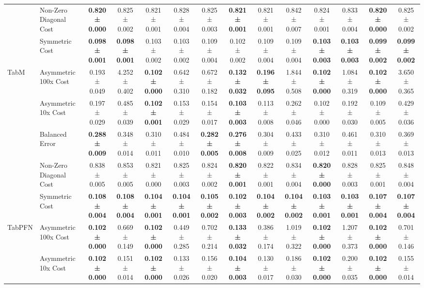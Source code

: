 \begin{table}[H]
{\begin{tabular}{llcccccccccccc}
 & Non-Zero Diagonal Cost & \textbf{0.820 ± 0.000} & 0.825 ± 0.002 & 0.821 ± 0.001 & 0.828 ± 0.004 & 0.825 ± 0.003 & \textbf{0.821 ± 0.001} & 0.821 ± 0.001 & 0.842 ± 0.007 & 0.824 ± 0.001 & 0.833 ± 0.004 & \textbf{0.820 ± 0.000} & 0.825 ± 0.002 \\
 & Symmetric Cost & \textbf{0.098 ± 0.001} & \textbf{0.098 ± 0.001} & 0.103 ± 0.002 & 0.103 ± 0.002 & 0.109 ± 0.004 & 0.102 ± 0.002 & 0.109 ± 0.004 & 0.109 ± 0.004 & \textbf{0.103 ± 0.003} & \textbf{0.103 ± 0.003} & \textbf{0.099 ± 0.002} & \textbf{0.099 ± 0.002} \\
\cline{1-14}
\multirow[t]{5}{*}{TabM} & Asymmetric 100x Cost & 0.193 ± 0.049 & 4.252 ± 0.402 & \textbf{0.102 ± 0.000} & 0.642 ± 0.310 & 0.672 ± 0.182 & \textbf{0.132 ± 0.032} & \textbf{0.196 ± 0.095} & 1.844 ± 0.508 & \textbf{0.102 ± 0.000} & 1.084 ± 0.319 & \textbf{0.102 ± 0.000} & 3.650 ± 0.365 \\
 & Asymmetric 10x Cost & 0.197 ± 0.029 & 0.485 ± 0.039 & \textbf{0.102 ± 0.001} & 0.153 ± 0.029 & 0.154 ± 0.017 & \textbf{0.103 ± 0.003} & 0.113 ± 0.008 & 0.262 ± 0.046 & 0.102 ± 0.000 & 0.192 ± 0.030 & 0.109 ± 0.005 & 0.429 ± 0.036 \\
 & Balanced Error & \textbf{0.288 ± 0.009} & 0.348 ± 0.014 & 0.310 ± 0.011 & 0.484 ± 0.010 & \textbf{0.282 ± 0.005} & \textbf{0.276 ± 0.008} & 0.304 ± 0.009 & 0.433 ± 0.025 & 0.310 ± 0.012 & 0.461 ± 0.011 & 0.310 ± 0.013 & 0.369 ± 0.013 \\
 & Non-Zero Diagonal Cost & 0.838 ± 0.005 & 0.853 ± 0.005 & 0.821 ± 0.000 & 0.825 ± 0.003 & 0.824 ± 0.002 & \textbf{0.820 ± 0.001} & 0.822 ± 0.001 & 0.834 ± 0.004 & \textbf{0.820 ± 0.000} & 0.828 ± 0.003 & 0.825 ± 0.001 & 0.848 ± 0.004 \\
 & Symmetric Cost & \textbf{0.108 ± 0.004} & \textbf{0.108 ± 0.004} & \textbf{0.104 ± 0.001} & \textbf{0.104 ± 0.001} & \textbf{0.105 ± 0.002} & \textbf{0.102 ± 0.003} & \textbf{0.104 ± 0.002} & \textbf{0.104 ± 0.002} & \textbf{0.103 ± 0.001} & \textbf{0.103 ± 0.001} & \textbf{0.107 ± 0.004} & \textbf{0.107 ± 0.004} \\
\cline{1-14}
\multirow[t]{5}{*}{TabPFN} & Asymmetric 100x Cost & \textbf{0.102 ± 0.000} & 0.669 ± 0.149 & \textbf{0.102 ± 0.000} & 0.449 ± 0.285 & 0.702 ± 0.214 & \textbf{0.133 ± 0.032} & 0.386 ± 0.174 & 1.019 ± 0.322 & \textbf{0.102 ± 0.000} & 1.207 ± 0.373 & \textbf{0.102 ± 0.000} & 0.701 ± 0.146 \\
 & Asymmetric 10x Cost & \textbf{0.102 ± 0.000} & 0.151 ± 0.014 & \textbf{0.102 ± 0.000} & 0.133 ± 0.026 & 0.156 ± 0.020 & \textbf{0.104 ± 0.003} & 0.130 ± 0.017 & 0.186 ± 0.030 & \textbf{0.102 ± 0.000} & 0.200 ± 0.035 & \textbf{0.102 ± 0.000} & 0.155 ± 0.014 \\

\end{tabular}}
\end{table}
